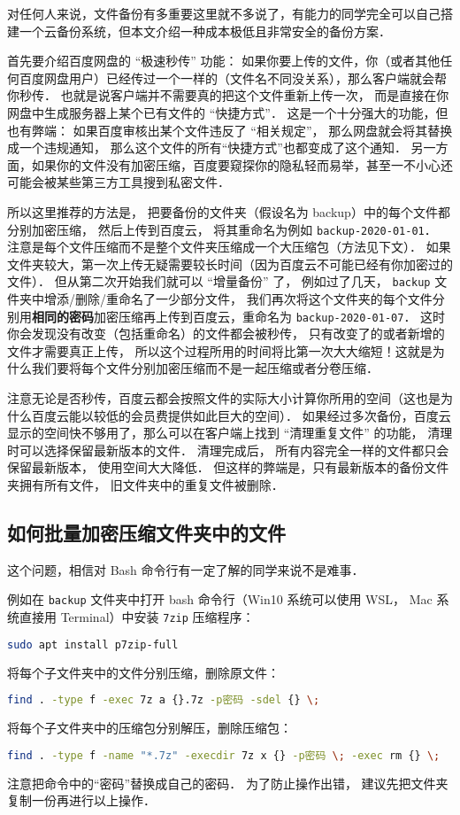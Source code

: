 
对任何人来说，文件备份有多重要这里就不多说了，有能力的同学完全可以自己搭建一个云备份系统，但本文介绍一种成本极低且非常安全的备份方案．

首先要介绍百度网盘的 “极速秒传” 功能： 如果你要上传的文件，你（或者其他任何百度网盘用户）已经传过一个一样的（文件名不同没关系），那么客户端就会帮你秒传． 也就是说客户端并不需要真的把这个文件重新上传一次， 而是直接在你网盘中生成服务器上某个已有文件的 “快捷方式”． 这是一个十分强大的功能，但也有弊端： 如果百度审核出某个文件违反了 “相关规定”， 那么网盘就会将其替换成一个违规通知， 那么这个文件的所有“快捷方式”也都变成了这个通知． 另一方面，如果你的文件没有加密压缩，百度要窥探你的隐私轻而易举，甚至一不小心还可能会被某些第三方工具搜到私密文件．

所以这里推荐的方法是， 把要备份的文件夹（假设名为 backup）中的每个文件都分别加密压缩， 然后上传到百度云， 将其重命名为例如 \verb|backup-2020-01-01|． 注意是每个文件压缩而不是整个文件夹压缩成一个大压缩包（方法见下文）． 如果文件夹较大，第一次上传无疑需要较长时间（因为百度云不可能已经有你加密过的文件）． 但从第二次开始我们就可以 “增量备份” 了， 例如过了几天， \verb|backup| 文件夹中增添/删除/重命名了一少部分文件， 我们再次将这个文件夹的每个文件分别用\textbf{相同的密码}加密压缩再上传到百度云，重命名为 \verb|backup-2020-01-07|． 这时你会发现没有改变（包括重命名）的文件都会被秒传， 只有改变了的或者新增的文件才需要真正上传， 所以这个过程所用的时间将比第一次大大缩短！这就是为什么我们要将每个文件分别加密压缩而不是一起压缩或者分卷压缩．

注意无论是否秒传，百度云都会按照文件的实际大小计算你所用的空间（这也是为什么百度云能以较低的会员费提供如此巨大的空间）． 如果经过多次备份，百度云显示的空间快不够用了，那么可以在客户端上找到 “清理重复文件” 的功能， 清理时可以选择保留最新版本的文件． 清理完成后， 所有内容完全一样的文件都只会保留最新版本， 使用空间大大降低． 但这样的弊端是，只有最新版本的备份文件夹拥有所有文件， 旧文件夹中的重复文件被删除．

\subsection{如何批量加密压缩文件夹中的文件}

这个问题，相信对 Bash 命令行有一定了解的同学来说不是难事．

例如在 \verb|backup| 文件夹中打开 bash 命令行（Win10 系统可以使用 WSL， Mac 系统直接用 Terminal）中安装 \verb|7zip| 压缩程序：
\begin{lstlisting}[language=bash]
sudo apt install p7zip-full
\end{lstlisting}
将每个子文件夹中的文件分别压缩，删除原文件：
\begin{lstlisting}[language=bash]
find . -type f -exec 7z a {}.7z -p密码 -sdel {} \;
\end{lstlisting}
将每个子文件夹中的压缩包分别解压，删除压缩包：
\begin{lstlisting}[language=bash]
find . -type f -name "*.7z" -execdir 7z x {} -p密码 \; -exec rm {} \;
\end{lstlisting}
注意把命令中的“密码”替换成自己的密码． 为了防止操作出错， 建议先把文件夹复制一份再进行以上操作．
